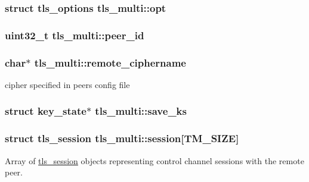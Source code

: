 \subsubsection[{opt}]{\setlength{\rightskip}{0pt plus 5cm}struct {\bf tls\+\_\+options} tls\+\_\+multi\+::opt}\label{structtls__multi_a6cd0005716f05da0398d85f6f1693e5d}
\hypertarget{structtls__multi_a93c90f22f9fbbd1898ea9708a49ee1f7}{}
\subsubsection[{peer\+\_\+id}]{\setlength{\rightskip}{0pt plus 5cm}uint32\+\_\+t tls\+\_\+multi\+::peer\+\_\+id}\label{structtls__multi_a93c90f22f9fbbd1898ea9708a49ee1f7}
\hypertarget{structtls__multi_a5dcccc0eb320a38f6a20923c742046b2}{}
\subsubsection[{remote\+\_\+ciphername}]{\setlength{\rightskip}{0pt plus 5cm}char$\ast$ tls\+\_\+multi\+::remote\+\_\+ciphername}\label{structtls__multi_a5dcccc0eb320a38f6a20923c742046b2}
cipher specified in peer\textquotesingle{}s config file \hypertarget{structtls__multi_a522b67985ccd1faa266d4a26c978457a}{}
\subsubsection[{save\+\_\+ks}]{\setlength{\rightskip}{0pt plus 5cm}struct {\bf key\+\_\+state}$\ast$ tls\+\_\+multi\+::save\+\_\+ks}\label{structtls__multi_a522b67985ccd1faa266d4a26c978457a}
\hypertarget{structtls__multi_a74e065e432f819307a830ef38d5be73c}{}
\subsubsection[{session}]{\setlength{\rightskip}{0pt plus 5cm}struct {\bf tls\+\_\+session} tls\+\_\+multi\+::session\mbox{[}{\bf T\+M\+\_\+\+S\+I\+Z\+E}\mbox{]}}\label{structtls__multi_a74e065e432f819307a830ef38d5be73c}
Array of {\ttfamily \hyperlink{structtls__session}{tls\+\_\+session}} objects representing control channel sessions with the remote peer. \hypertarget{structtls__multi_a35cf748c1d74ed47cd38b6c6ea096202}{}
